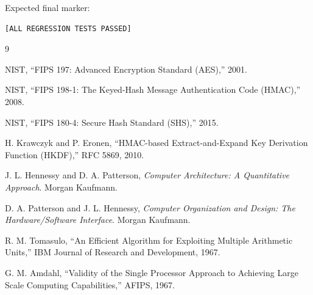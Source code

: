 \documentclass[conference]{IEEEtran}
\begin{document}
Expected final marker:

\begin{lstlisting}
[ALL REGRESSION TESTS PASSED]
\end{lstlisting}

\balance

\begin{thebibliography}{9}

NIST, ``FIPS 197: Advanced Encryption Standard (AES),'' 2001.

NIST, ``FIPS 198-1: The Keyed-Hash Message Authentication Code (HMAC),'' 2008.

NIST, ``FIPS 180-4: Secure Hash Standard (SHS),'' 2015.

H. Krawczyk and P. Eronen, ``HMAC-based Extract-and-Expand Key Derivation Function (HKDF),'' RFC 5869, 2010.

J. L. Hennessy and D. A. Patterson, \emph{Computer Architecture: A Quantitative Approach}. Morgan Kaufmann.

D. A. Patterson and J. L. Hennessy, \emph{Computer Organization and Design: The Hardware/Software Interface}. Morgan Kaufmann.

R. M. Tomasulo, ``An Efficient Algorithm for Exploiting Multiple Arithmetic Units,'' IBM Journal of Research and Development, 1967.

G. M. Amdahl, ``Validity of the Single Processor Approach to Achieving Large Scale Computing Capabilities,'' AFIPS, 1967.

\end{thebibliography}
\end{document}

